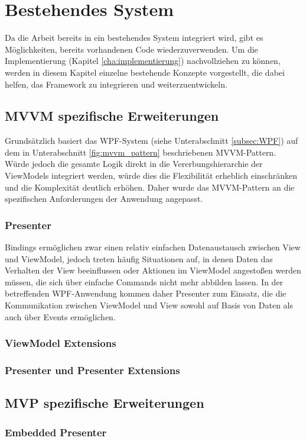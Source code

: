 \chapter{Bestehendes System}
\label{cha:basis}
Da die Arbeit bereits in ein bestehendes System integriert wird, gibt es Möglichkeiten, bereits vorhandenen Code wiederzuverwenden. Um die Implementierung (Kapitel \ref{cha:implementierung}) nachvollziehen zu können, werden in diesem Kapitel einzelne bestehende Konzepte vorgestellt, die dabei helfen, das Framework zu integrieren und weiterzuentwickeln.

\section{MVVM spezifische Erweiterungen}
\label{sec:mvvm_extensions}
Grundsätzlich basiert das WPF-System (siehe Unterabschnitt \ref{subsec:WPF}) auf dem in Unterabschnitt \ref{fig:mvvm_pattern} beschriebenen MVVM-Pattern. Würde jedoch die gesamte Logik direkt in die Vererbungshierarchie der ViewModels integriert werden, würde dies die Flexibilität erheblich einschränken und die Komplexität deutlich erhöhen. Daher wurde das MVVM-Pattern an die spezifischen Anforderungen der Anwendung angepasst.

\subsection{Presenter}
Bindings ermöglichen zwar einen relativ einfachen Datenaustausch zwischen View und ViewModel, jedoch treten häufig Situationen auf, in denen Daten das Verhalten der View beeinflussen oder Aktionen im ViewModel angestoßen werden müssen, die sich über einfache Commands nicht mehr abbilden lassen. In der betreffenden WPF-Anwendung kommen daher Presenter zum Einsatz, die die Kommunikation zwischen ViewModel und View sowohl auf Basis von Daten als auch über Events ermöglichen.


\subsection{ViewModel Extensions}
\label{subsec:viewmodel_extensions}

\subsection{Presenter und Presenter Extensions}
\label{subsec:presenter_extensions}

\section{MVP spezifische Erweiterungen}
\label{sec:mvp_extensions}

\subsection{Embedded Presenter}
\label{subsec:embedded_presenter}